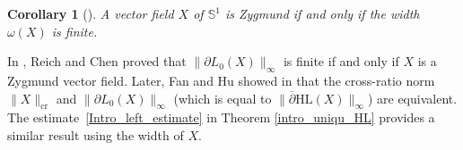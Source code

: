 \documentclass[11pt]{article}
\theoremstyle{plain}
\newtheorem{cor}{Corollary}[section]
\theoremstyle{definition}
\begin{document}
\begin{cor}[{\cite[Th.\,1.3 \& Eq.\,(96)]{diaf2023Infearth}}]\label{Cor_diaf_inf}
A vector field $X$ of $\mathbb{S}^1$ is Zygmund if and only if the width $\omega(X)$ is finite.
\end{cor}

In \cite{Extension_with_bounded_derivative}, Reich and Chen proved that \(\lVert \partial L_0(X) \rVert_{\infty} \) is finite if and only if \(X \) is a Zygmund vector field. Later, Fan and Hu showed in \cite{FanJun} that the cross-ratio norm~\(\lVert X \rVert_\mathrm{cr} \) and \(\lVert \partial L_0(X) \rVert_{\infty} \) (which is equal to \(\lVert \overline{\partial} \mathrm{HL}(X) \rVert_{\infty} \)) are equivalent. The estimate~\eqref{Intro_left_estimate} in Theorem \ref{intro_uniqu_HL} provides a similar result using the width of \(X \).
\end{document}

